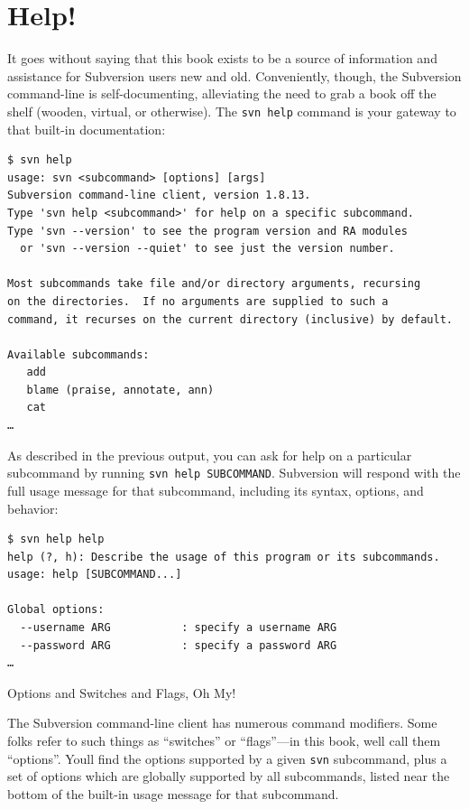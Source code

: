 \section{Help!}\label{svn.tour.help}

It goes without saying that this book exists to be a source of
information and assistance for Subversion users new and old.
Conveniently, though, the Subversion command-line is self-documenting,
alleviating the need to grab a book off the shelf (wooden, virtual, or
otherwise). The \texttt{svn\ help} command is your gateway to that
built-in documentation:

\begin{verbatim}
$ svn help
usage: svn <subcommand> [options] [args]
Subversion command-line client, version 1.8.13.
Type 'svn help <subcommand>' for help on a specific subcommand.
Type 'svn --version' to see the program version and RA modules
  or 'svn --version --quiet' to see just the version number.

Most subcommands take file and/or directory arguments, recursing
on the directories.  If no arguments are supplied to such a
command, it recurses on the current directory (inclusive) by default.

Available subcommands:
   add
   blame (praise, annotate, ann)
   cat
…
\end{verbatim}

As described in the previous output, you can ask for help on a
particular subcommand by running \texttt{svn\ help\ SUBCOMMAND}.
Subversion will respond with the full usage message for that subcommand,
including its syntax, options, and behavior:

\begin{verbatim}
$ svn help help
help (?, h): Describe the usage of this program or its subcommands.
usage: help [SUBCOMMAND...]

Global options:
  --username ARG           : specify a username ARG
  --password ARG           : specify a password ARG
…
\end{verbatim}

Options and Switches and Flags, Oh My!

The Subversion command-line client has numerous command modifiers. Some
folks refer to such things as ``switches'' or ``flags''---in this book,
we\textquotesingle ll call them ``options''. You\textquotesingle ll find
the options supported by a given \texttt{svn} subcommand, plus a set of
options which are globally supported by all subcommands, listed near the
bottom of the built-in usage message for that subcommand.

